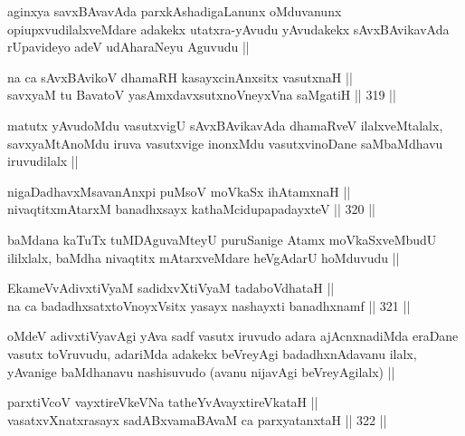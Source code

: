 \begin{artha}
aginxya savxBAvavAda parxkAshadigaLanunx oMduvanunx
opiupxvudilalxveMdare adakekx utatxra-yAvudu yAvudakekx sAvxBAvikavAda
rUpavideyo adeV udAharaNeyu Aguvudu ||
\end{artha}

\begin{shl}
na ca sAvxBAvikoV dhamaRH kasayxcinAnxsitx vasutxnaH || \\
savxyaM tu BavatoV yasAmxdavxsutxnoV\s neyxVna saMgatiH ||  319 ||  
\end{shl}

\begin{artha}
matutx yAvudoMdu vasutxvigU sAvxBAvikavAda dhamaRveV ilalxveMtalalx,
savxyaMtAnoMdu iruva vasutxvige inonxMdu vasutxvinoDane saMbaMdhavu
iruvudilalx ||
\end{artha}

\begin{shl}
nigaDadhavxMsavanAnxpi puMsoV moVkaSx ihA\s \s tamxnaH ||  \\
nivaqtitxmAtarxM banadhxsayx kathaMcidupapadayxteV ||  320 ||  
\end{shl}

\begin{artha}
baMdana kaTuTx tuMDAguvaMteyU puruSanige Atamx moVkaSxveMbudU
ililxlalx, baMdha nivaqtitx mAtarxveMdare heVgAdarU hoMduvudu ||
\end{artha}

\begin{shl}
EkameVvAdivxtiVyaM sadidxvXtiVyaM tadaboVdhataH || \\
na ca badadhxsatxtoV\s noyxV\s sitx yasayx nashayxti banadhxnamf ||  321 ||  
\end{shl}

\begin{artha}
oMdeV adivxtiVyavAgi yAva sadf vasutx iruvudo adara ajAcnxnadiMda
eraDane vasutx toVruvudu, adariMda adakekx beVreyAgi badadhxnAdavanu
ilalx, yAvanige baMdhanavu nashisuvudo (avanu nijavAgi beVreyAgilalx) ||
\end{artha}


\begin{shl}
parxtiVcoV vayxtireVkeVNa tatheYvAvayxtireVkataH || \\
vasatxvXnatxrasayx sadABxvamaBAvaM ca parxyatanxtaH ||  322 ||  
\end{shl}
				
